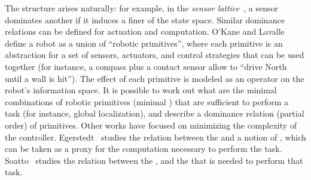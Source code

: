 
The  structure arises naturally: for example, in the \emph{sensor lattice}~\cite{lavalle12sensing}, a sensor dominates another if it induces a finer  of the state space.
Similar dominance relations can be defined for actuation and computation.
O'Kane and Lavalle~\cite{okane08comparing} define a robot as a union of ``robotic primitives'', where each primitive is an abstraction for a set of sensors, actuators, and control strategies that can be used together
(for instance, a compass plus a contact sensor allow to ``drive North until a wall is hit'').
The effect of each primitive is modeled as an operator on the robot's information space.
It is possible to work out what are the minimal combinations of robotic primitives (minimal ) that are sufficient to perform a task (for instance, global localization), and describe a dominance relation (partial order) of primitives.
Other works have focused on minimizing the complexity of the controller.
Egerstedt~\cite{egerstedt03motion} studies the relation between the  and a notion of , which can be taken as a proxy for the computation necessary to perform the task.
Soatto~\cite{soatto11steps} studies the relation between the , and the  that is needed to perform that task.


